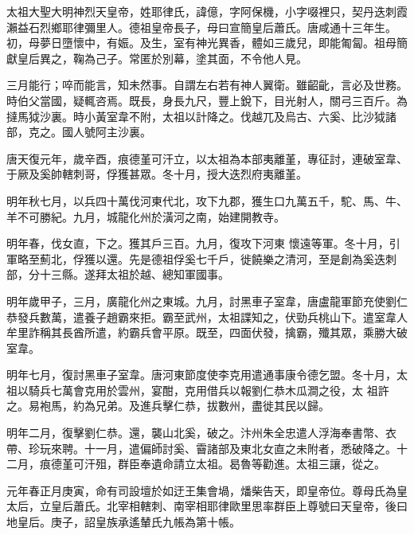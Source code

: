 
\begin{pinyinscope}

 太祖大聖大明神烈天皇帝，姓耶律氏，諱億，字阿保機，小字啜裡只，契丹迭刺霞瀨益石烈鄉耶律彌里人。德祖皇帝長子，母曰宣簡皇后蕭氏。唐咸通十三年生。初，母夢日墮懷中，有娠。及生，室有神光異香，體如三歲兒，即能匍匐。祖母簡獻皇后異之，鞠為己子。常匿於別幕，塗其面，不令他人見。



 三月能行；啐而能言，知未然事。自謂左右若有神人翼衛。雖齠齔，言必及世務。時伯父當國，疑輒咨焉。既長，身長九尺，豐上銳下，目光射人，關弓三百斤。為撻馬狘沙裏。時小黃室韋不附，太祖以計降之。伐越兀及烏古、六奚、比沙狘諸部，克之。國人號阿主沙裏。



 唐天復元年，歲辛酉，痕德堇可汗立，以太祖為本部夷離堇，專征討，連破室韋、于厥及奚帥轄刺哥，俘獲甚眾。冬十月，授大迭烈府夷離堇。



 明年秋七月，以兵四十萬伐河東代北，攻下九郡，獲生口九萬五千，駝、馬、牛、羊不可勝紀。九月，城龍化州於潢河之南，始建開教寺。



 明年春，伐女直，下之。獲其戶三百。九月，復攻下河東
 懷遠等軍。冬十月，引軍略至薊北，俘獲以還。先是德祖俘奚七千戶，徙饒樂之清河，至是創為奚迭刺部，分十三縣。遂拜太祖於越、總知軍國事。



 明年歲甲子，三月，廣龍化州之東城。九月，討黑車子室韋，唐盧龍軍節充使劉仁恭發兵數萬，遣養子趙霸來拒。霸至武州，太祖諜知之，伏勁兵桃山下。遣室韋人牟里詐稱其長酋所遣，約霸兵會平原。既至，四面伏發，擒霸，殲其眾，乘勝大破室韋。



 明年七月，復討黑車子室韋。唐河東節度使李克用遣通事康令德乞盟。冬十月，太祖以騎兵七萬會克用於雲州，宴酣，克用借兵以報劉仁恭木瓜澗之役，太
 祖許之。易袍馬，約為兄弟。及進兵擊仁恭，拔數州，盡徙其民以歸。



 明年二月，復擊劉仁恭。還，襲山北奚，破之。汴州朱全忠遣人浮海奉書幣、衣帶、珍玩來聘。十一月，遣偏師討奚、霫諸部及東北女直之未附者，悉破降之。十二月，痕德堇可汗殂，群臣奉遺命請立太祖。曷魯等勸進。太祖三讓，從之。



 元年春正月庚寅，命有司設壇於如迂王集會堝，燔柴告天，即皇帝位。尊母氏為皇太后，立皇后蕭氏。北宰相轄刺、南宰相耶律歐里思率群臣上尊號曰天皇帝，後曰地皇后。庚子，詔皇族承遙輦氏九帳為第十帳。




\end{pinyinscope}
